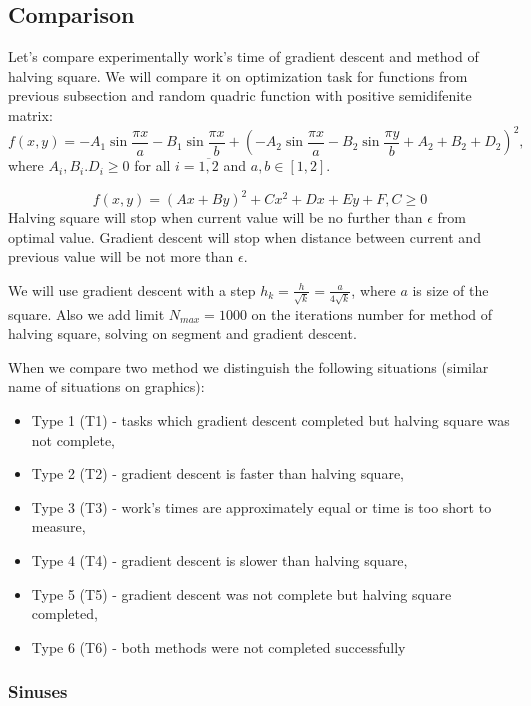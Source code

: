 \documentclass[12pt]{article}
\begin{document}
\subsection{Comparison}

Let's compare experimentally work's time of gradient descent and method of halving square. We will compare it on optimization task for functions from previous subsection and random quadric function with positive semidifenite matrix:
\begin{equation}\label{ex_1}
f(x,y) = -A_1\sin\frac{\pi x}{a} - B_1\sin\frac{\pi x}{b} + \left(-A_2\sin\frac{\pi x}{a} - B_2\sin\frac{\pi y}{b} + A_2 + B_2 + D_2\right)^2,
\end{equation}
where $A_i, B_i. D_i\geq 0$ for all $i = \overline{1, 2}$ and $a, b \in [1,2]$.

\begin{equation}\label{ex_2}
f(x,y) = (Ax + By)^2 + Cx^2 + Dx + Ey+ F, C\geq 0
\end{equation}
Halving square will stop when current value will be no further than $\epsilon$ from optimal value. Gradient descent will stop when distance between current and previous value will be not more than $\epsilon$.

We will use gradient descent with a step $h_k = \frac{h}{\sqrt{k}} = \frac{a}{4\sqrt{k}}$, where $a$ is size of the square. Also we add limit $N_{max} = 1000$ on the iterations number for method of halving square, solving on segment and gradient descent.

When we compare two method we distinguish the following situations (similar name of situations on graphics):

\begin{itemize}
\item Type 1 (T1) - tasks which gradient descent completed but halving square was not complete,
\item Type 2 (T2) - gradient descent is faster than halving square,
\item Type 3 (T3) - work's times are approximately equal or time is too short to measure,
\item Type 4 (T4) - gradient descent is slower than halving square,
\item Type 5 (T5) - gradient descent was not complete but halving square completed,
\item Type 6 (T6) - both methods were not completed successfully
\end{itemize}


\subsubsection{Sinuses}  
\end{document}
